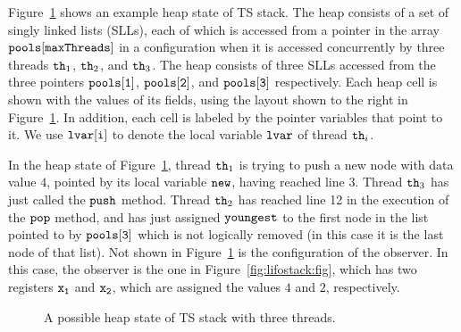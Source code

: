 Figure~\ref{fig:tsshape} shows an  example heap state of TS stack.
The heap consists of a set of singly linked lists (SLLs), each of which
is accessed from a pointer in the array ${\tt pools[maxThreads]}$
in a configuration when %
it is accessed concurrently by three threads ${\tt th}_1$, ${\tt th}_2$, and ${\tt th}_3$. The heap consists of three SLLs accessed from the three pointers $\tt pools[1]$, $\tt pools[2]$, and $\tt pools[3]$ respectively. Each heap cell is
shown with the values of its fields, using the layout shown to the right in
Figure~\ref{fig:tsshape}.
In addition, each cell is labeled by the
pointer variables that point to it. We use ${\tt lvar[i]}$ to denote the local
variable ${\tt lvar}$ of thread ${\tt th}_i$.

In the heap state of Figure~\ref{fig:tsshape},
thread ${\tt th}_1$ is trying to push a new node with data value $4$, pointed by its local variable $\tt new$, having reached line 3.
Thread ${\tt th}_3$ has just called the ${\tt push}$ method.
Thread ${\tt th}_2$ has reached line 12 in the execution of the ${\tt pop}$ method,  and has just assigned ${\tt youngest}$ to the first node in the list
pointed to by $\tt pools[3]$ which is not logically removed (in this case it is the last node of that list).
Not shown in Figure~\ref{fig:tsshape} is the configuration of the
observer.
In this case, the
observer is the one in Figure~\ref{fig:lifostack:fig}, which has two registers
$\tt x_1$ and $\tt x_2$, which are assigned the values $4$ and $2$,
respectively.

\begin{figure}
	
\caption{A possible heap state of TS stack with three threads.}
\label{fig:tsshape}
\end{figure} 

